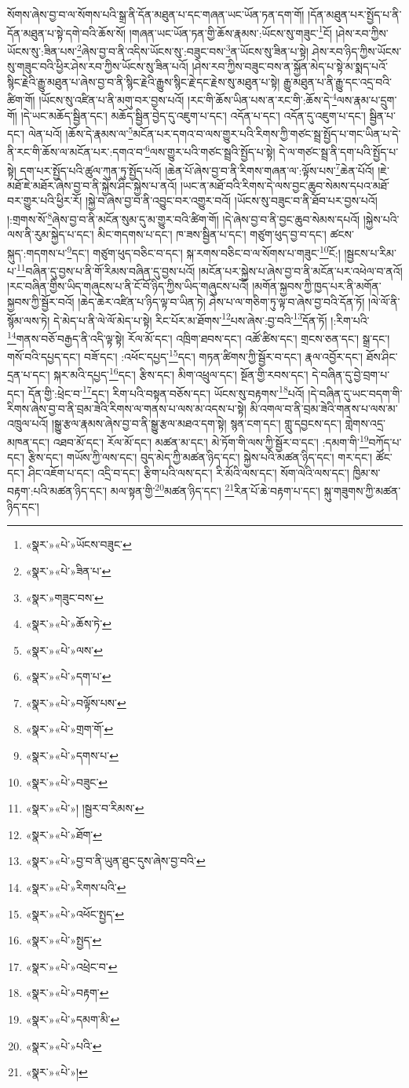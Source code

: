 སོགས་ཞེས་བྱ་བ་ལ་སོགས་པའི་སྒྲ་ནི་དོན་མཐུན་པ་དང་གཞན་ཡང་ཡོན་ཏན་དག་གོ། །དོན་མཐུན་པར་སྤྱོད་པ་ནི་དོན་མཐུན་པ་སྟེ་དགེ་བའི་ཆོས་སོ། །གཞན་ཡང་ཡོན་ཏན་གྱི་ཆོས་རྣམས་:ཡོངས་སུ་གཟུང་\footnote{«སྣར་»«པེ་»ཡོངས་བཟུང་}ངོ། །ཤེས་རབ་ཀྱིས་ཡོངས་སུ་:ཟིན་པས་\footnote{«སྣར་»«པེ་»ཟིན་པ་}ཞེས་བྱ་བ་ནི་འདིས་ཡོངས་སུ་:བཟུང་བས་\footnote{«སྣར་»གཟུང་བས་}ན་ཡོངས་སུ་ཟིན་པ་སྟེ། ཤེས་རབ་ཉིད་ཀྱིས་ཡོངས་སུ་གཟུང་བའི་ཕྱིར་ཤེས་རབ་ཀྱིས་ཡོངས་སུ་ཟིན་པའོ། །ཤེས་རབ་ཀྱིས་བཟུང་བས་ན་སྐྱོན་མེད་པ་སྟེ་མ་སྨད་པའོ་སྙིང་རྗེའི་རྒྱུ་མཐུན་པ་ཞེས་བྱ་བ་ནི་སྙིང་རྗེའི་རྒྱུས་སྙིང་རྗེ་དང་རྗེས་སུ་མཐུན་པ་སྟེ། རྒྱུ་མཐུན་པ་ནི་རྒྱུ་དང་འདྲ་བའི་ཚིག་གོ། །ཡོངས་སུ་འཛིན་པ་ནི་མགུ་བར་བྱས་པའོ། །རང་གི་ཆོས་ཡིན་པས་ན་རང་གི་:ཆོས་དེ་\footnote{«སྣར་»«པེ་»ཆོས་ཏེ་}ལས་རྣམ་པ་དྲུག་གོ། །དེ་ཡང་མཆོད་སྦྱིན་དང་། མཆོད་སྦྱིན་བྱེད་དུ་འཇུག་པ་དང་། འདོན་པ་དང་། འདོན་དུ་འཇུག་པ་དང་། སྦྱིན་པ་དང་། ལེན་པའོ། །ཆོས་དེ་རྣམས་ལ་\footnote{«སྣར་»«པེ་»ལས་}མངོན་པར་དགའ་བ་ལས་གྱུར་པའི་རིགས་ཀྱི་གཙང་སྦྲ་སྤྱོད་པ་གང་ཡིན་པ་དེ་ནི་རང་གི་ཆོས་ལ་མངོན་པར་:དགའ་བ་\footnote{«སྣར་»«པེ་»དག་པ་}ལས་གྱུར་པའི་གཙང་སྦྲའི་སྤྱོད་པ་སྟེ། དེ་ལ་གཙང་སྦྲ་ནི་དག་པའི་སྤྱོད་པ་སྟེ། དག་པར་སྤྱོད་པའི་ཚུལ་ཀུན་ཏུ་སྤྱོད་པའོ། །ཆེན་པོ་ཞེས་བྱ་བ་ནི་རིགས་གཞན་ལ་:ལྟོས་པས་\footnote{«སྣར་»«པེ་»བལྟོས་པས་}ཆེན་པོའོ། །ཇེ་མཐོ་ཇེ་མཐོར་ཞེས་བྱ་བ་ནི་སྐྱེས་ཤིང་སྐྱེས་པ་ནའོ། །ཡང་ན་མཐོ་བའི་རིགས་དེ་ལས་བྱང་ཆུབ་སེམས་དཔའ་མཐོ་བར་གྱུར་པའི་ཕྱིར་རོ། །སྐྱེ་བ་ཞེས་བྱ་བ་ནི་འབྱུང་བར་འགྱུར་བའོ། །ཡོངས་སུ་བཟུང་བ་ནི་ཐོབ་པར་བྱས་པའོ། །:གྲགས་སོ་\footnote{«སྣར་»«པེ་»གྲག་གོ་}ཞེས་བྱ་བ་ནི་མངོན་སུམ་དུ་མ་གྱུར་བའི་ཚིག་གོ། །དེ་ཞེས་བྱ་བ་ནི་བྱང་ཆུབ་སེམས་དཔའོ། །སྐྱེས་པའི་ལས་ནི་རུམ་སྐྱེད་པ་དང་། མིང་གདགས་པ་དང་། ཁ་ཟས་སྦྱིན་པ་དང་། གཙུག་ཕུད་བྱ་བ་དང་། ཚངས་སྐུད་:གདགས་པ་\footnote{«སྣར་»«པེ་»དགས་པ་}དང་། གཙུག་ཕུད་བཅིང་བ་དང་། སྐ་རགས་བཅིང་བ་ལ་སོགས་པ་གཟུང་\footnote{«སྣར་»«པེ་»བཟུང་}ངོ:། །སྦྱངས་པ་རིམ་པ་\footnote{«སྣར་»«པེ་»། །སྦྱར་བ་རིམས་}བཞིན་དུ་བྱས་པ་ནི་གོ་རིམས་བཞིན་དུ་བྱས་པའོ། །མངོན་པར་སྐྱེས་པ་ཞེས་བྱ་བ་ནི་མངོན་པར་འཕེལ་བ་ནའོ། །རང་བཞིན་གྱིས་ཡིད་གཞུངས་པ་ནི་ངོ་བོ་ཉིད་ཀྱིས་ཡིད་གཞུངས་པའོ། །མགོན་སྐྱབས་ཀྱི་ཁྱད་པར་ནི་མགོན་སྐྱབས་ཀྱི་སྦྱོར་བའོ། །ཆེད་ཆེར་འཛིན་པ་ཉིད་ལྟ་བ་ཡིན་ཏེ། ཤེས་པ་ལ་གཅིག་ཏུ་ལྟ་བ་ཞེས་བྱ་བའི་དོན་ཏོ། །ལེ་ལོ་ནི་སྙོམ་ལས་ཏེ། དེ་མེད་པ་ནི་ལེ་ལོ་མེད་པ་སྟེ། རིང་པོར་མ་ཐོགས་\footnote{«སྣར་»«པེ་»ཐོག་}པས་ཞེས་:བྱ་བའི་\footnote{«སྣར་»«པེ་»བྱ་བ་ནི་ཡུན་ཐུང་དུས་ཞེས་བྱ་བའི་}དོན་ཏོ། །:རིག་པའི་\footnote{«སྣར་»«པེ་»རིགས་པའི་}གནས་བཅོ་བརྒྱད་ནི་འདི་ལྟ་སྟེ། རོལ་མོ་དང་། འཁྲིག་ཐབས་དང་། འཚོ་ཚིས་དང་། གྲངས་ཅན་དང་། སྒྲ་དང་། གསོ་བའི་དཔྱད་དང་། བཟོ་དང་། :འཕོང་དཔྱད་\footnote{«སྣར་»«པེ་»འཕོང་སྤྱད་}དང་། གཏན་ཚིགས་ཀྱི་སྦྱོར་བ་དང་། རྣལ་འབྱོར་དང་། ཐོས་ཤིང་དྲན་པ་དང་། སྐར་མའི་དཔྱད་\footnote{«སྣར་»«པེ་»སྤྱད་}དང་། རྩིས་དང་། མིག་འཕྲུལ་དང་། སྔོན་གྱི་རབས་དང་། དེ་བཞིན་དུ་བྱེ་བྲག་པ་དང་། དོན་གྱི་:ཕྲེང་བ་\footnote{«སྣར་»«པེ་»འཕྲེང་བ་}དང་། རིག་པའི་བསྟན་བཅོས་དང་། ཡོངས་སུ་བརྟགས་\footnote{«སྣར་»«པེ་»བརྟག་}པའོ། །དེ་བཞིན་དུ་ཡང་བདག་གི་རིགས་ཞེས་བྱ་བ་ནི་བྲམ་ཟེའི་རིགས་ལ་གནས་པ་ལས་མ་འདས་པ་སྟེ། མི་འགལ་བ་ནི་བྲམ་ཟེའི་གནས་པ་ལས་མ་འཁྲུལ་པའོ། །སྒྱུ་རྩལ་རྣམས་ཞེས་བྱ་བ་ནི་སྒྱུ་རྩལ་མཐའ་དག་སྟེ། སྙན་ངག་དང་། གླུ་དབྱངས་དང་། གླེགས་འདྲ་མཁན་དང་། འཐབ་མོ་དང་། རོལ་མོ་དང་། མཚན་མ་དང་། མེ་ཏོག་གི་ལས་ཀྱི་སྦྱོར་བ་དང་། :དམག་གི་\footnote{«སྣར་»«པེ་»དམག་མི་}བཀོད་པ་དང་། རྩིས་དང་། གཡོས་ཀྱི་ལས་དང་། བུད་མེད་ཀྱི་མཚན་ཉིད་དང་། སྐྱེས་པའི་མཚན་ཉིད་དང་། གར་དང་། ཚོང་དང་། ཤིང་འཇོག་པ་དང་། འདྲི་བ་དང་། རྩིག་པའི་ལས་དང་། རི་མོའི་ལས་དང་། སོག་ལེའི་ལས་དང་། ཁྱིམ་ས་བརྟག་:པའི་མཚན་ཉིད་དང་། མལ་སྟན་གྱི་\footnote{«སྣར་»«པེ་»པའི་}མཚན་ཉིད་དང་། \footnote{«སྣར་»«པེ་»།  }རིན་པོ་ཆེ་བརྟག་པ་དང་། སྐུ་གཟུགས་ཀྱི་མཚན་ཉིད་དང་། 